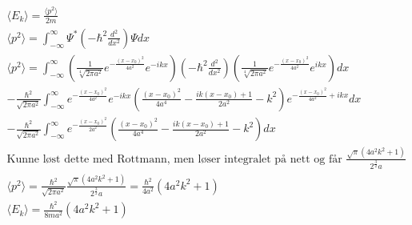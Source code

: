 \documentclass[11pt, A4paper,norsk]{article}
\begin{document}
				\begin{gather*}
\langle E_k \rangle = \frac{\langle p^2 \rangle}{2m} \\
\langle p^2 \rangle = \int_{- \infty}^{\infty} \Psi^{*} \left( - \hbar^2 \frac{d^2}{dx^2} \right) \Psi dx \\
\langle p^2 \rangle = \int_{- \infty}^{\infty} \left( \frac{1}{\sqrt[4]{2 \pi a^2}} e^{- \frac{(x - x_0)^2}{4a^2}} e^{- ikx} \right) \left( - \hbar^2 \frac{d^2}{dx^2} \right) \left( \frac{1}{\sqrt[4]{2 \pi a^2}} e^{- \frac{(x - x_0)^2}{4a^2}} e^{ikx} \right) dx \\
- \frac{\hbar^2}{\sqrt{2 \pi a^2}} \int_{- \infty}^{\infty} e^{- \frac{(x - x_0)^2}{4a^2}} e^{- ikx} \left( \frac{(x - x_0)^2}{4a^4} - \frac{ik (x - x_0) + 1}{2a^2} - k^2 \right) e^{- \frac{(x - x_0)^2}{4a^2} + ikx} dx \\
- \frac{\hbar^2}{\sqrt{2 \pi a^2}} \int_{- \infty}^{\infty} e^{- \frac{(x - x_0)^2}{2a^2}} \left( \frac{(x - x_0)^2}{4a^4} - \frac{ik (x - x_0) + 1}{2a^2} - k^2 \right) dx \\
\text{Kunne løst dette med Rottmann, men løser integralet på nett og får $\frac{\sqrt{{\pi}}\left( 4a^2k^2+1 \right)}{2^\frac{3}{2} a}$} \\
\langle p^2 \rangle = \frac{\hbar^2}{\sqrt{2 \pi a^2}} \frac{\sqrt{{\pi}}\left( 4 a^2 k^2 + 1 \right)}{2^\frac{3}{2} a} = \frac{\hbar^2}{4 a^2} \left( 4 a^2 k^2 + 1 \right) \\
\langle E_k \rangle = \frac{\hbar^2}{8 m a^2} \left( 4 a^2 k^2 + 1 \right)
				\end{gather*}
\end{document}
